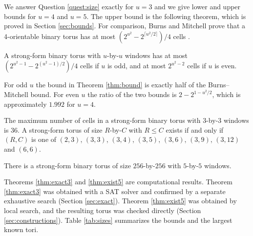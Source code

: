\documentclass{lipics-v2021}
\begin{document}
We answer Question \ref{quest:size} exactly for $u=3$ and we give lower and upper bounds for $u=4$ and $u=5$.
The upper bound is the following theorem, which is proved in Section \ref{sec:bounds}.
For comparison, Burns and Mitchell prove that a 4-orientable binary torus has at most $(2^{u^2} - 2^{\lceil u^2/2 \rceil})/4$ cells \cite[Lemma~19]{burns1993coding}.

\begin{theorem} \label{thm:bound}
A strong-form binary torus with $u$-by-$u$ windows has at most $(2^{u^2-1} - 2^{(u^2-1)/2})/4$ cells if $u$ is odd, and at most $2^{u^2-2}$ cells if $u$ is even.
\end{theorem}

For odd $u$ the bound in Theorem \ref{thm:bound} is exactly half of the Burns--Mitchell bound.
For even $u$ the ratio of the two bounds is $2 - 2^{1-u^2/2}$, which is approximately $1.992$ for $u=4$.

\begin{theorem} \label{thm:exact3}
The maximum number of cells in a strong-form binary torus with $3$-by-$3$ windows is $36$.
A strong-form torus of size $R$-by-$C$ with $R \leq C$ exists if and only if $(R,C)$ is one of $(2,3)$, $(3,3)$, $(3,4)$, $(3,5)$, $(3,6)$, $(3,9)$, $(3,12)$ and $(6,6)$.
\end{theorem}

\begin{theorem} \label{thm:exist5}
There is a strong-form binary torus of size $256$-by-$256$ with $5$-by-$5$ windows.
\end{theorem}

Theorems \ref{thm:exact3} and \ref{thm:exist5} are computational results.
Theorem \ref{thm:exact3} was obtained with a SAT solver and confirmed by a separate exhaustive search (Section \ref{sec:exact}).
Theorem \ref{thm:exist5} was obtained by local search, and the resulting torus was checked directly (Section \ref{sec:constructions}).
Table \ref{tab:sizes} summarizes the bounds and the largest known tori.
\end{document}
